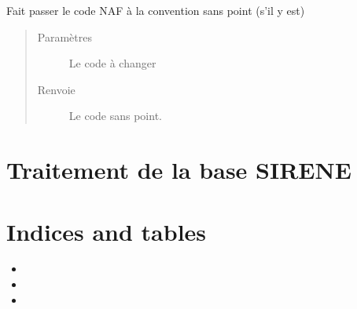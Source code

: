 \documentclass[letterpaper,10pt,french]{sphinxmanual}
\begin{document}

\begin{fulllineitems}
\label{\detokenize{index:src.clusterizer.utils.NAF_utils.retirer_point}}
\sphinxAtStartPar
Fait passer le code NAF à la convention sans point (s’il y est)
\begin{quote}\begin{description}
\item[{Paramètres}] \leavevmode
\sphinxAtStartPar
{} \textendash{} Le code à changer

\item[{Renvoie}] \leavevmode
\sphinxAtStartPar
Le code sans point.

\end{description}\end{quote}

\end{fulllineitems}



\chapter{Traitement de la base SIRENE}
\label{\detokenize{index:traitement-de-la-base-sirene}}

\chapter{Indices and tables}
\label{\detokenize{index:indices-and-tables}}\begin{itemize}
\item {} 
\sphinxAtStartPar
{}

\item {} 
\sphinxAtStartPar
{}

\item {} 
\sphinxAtStartPar
{}

\end{itemize}
\end{document}
